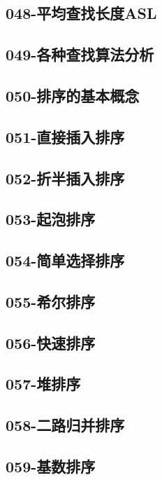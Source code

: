 \subsection{048-平均查找长度ASL}

\subsection{049-各种查找算法分析}

\subsection{050-排序的基本概念}

\subsection{051-直接插入排序}

\subsection{052-折半插入排序}

\subsection{053-起泡排序}

\subsection{054-简单选择排序}

\subsection{055-希尔排序}

\subsection{056-快速排序}

\subsection{057-堆排序}

\subsection{058-二路归并排序}

\subsection{059-基数排序}

